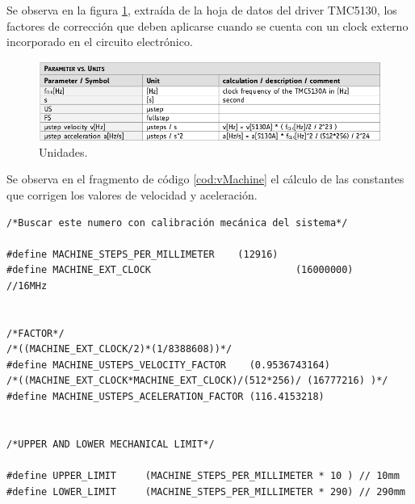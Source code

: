 Se observa en la figura \ref{fig:unidades}, extraída de la hoja de datos del driver TMC5130, los factores de corrección que deben aplicarse cuando se cuenta con un clock externo incorporado en el circuito electrónico. 

\begin{figure}[h!]
	\centering
	\includegraphics[width=1\textwidth]{./Figures/unit.png}
	\caption{Unidades.}
	\label{fig:unidades}
\end{figure}

Se observa en el fragmento de código \ref{cod:vMachine} el cálculo de las constantes que corrigen los valores de velocidad y aceleración.

 
 

\begin{lstlisting}[label=cod:vMachine,caption=Macros de desplazamiento y factores de corrección.]  % Start your code-block
/*Buscar este numero con calibración mecánica del sistema*/

#define MACHINE_STEPS_PER_MILLIMETER	(12916)		
#define MACHINE_EXT_CLOCK						  (16000000)	//16MHz


/*FACTOR*/
/*((MACHINE_EXT_CLOCK/2)*(1/8388608))*/	
#define MACHINE_USTEPS_VELOCITY_FACTOR	  (0.9536743164)
/*((MACHINE_EXT_CLOCK*MACHINE_EXT_CLOCK)/(512*256)/ (16777216) )*/
#define MACHINE_USTEPS_ACELERATION_FACTOR (116.4153218)


/*UPPER AND LOWER MECHANICAL LIMIT*/

#define UPPER_LIMIT 	(MACHINE_STEPS_PER_MILLIMETER * 10 ) // 10mm
#define LOWER_LIMIT		(MACHINE_STEPS_PER_MILLIMETER * 290) // 290mm

\end{lstlisting}







